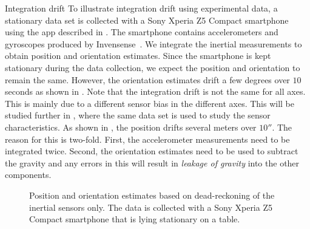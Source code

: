 \begin{myexample}{Integration drift}
To illustrate integration drift using experimental data, a stationary data set is collected with a Sony Xperia Z5 Compact smartphone using the app described in \cite{hendebyGWG:2017}. The smartphone contains accelerometers and gyroscopes produced by Invensense~\citep{invensense-tutorial}. We integrate the inertial measurements to obtain position and orientation estimates. Since the smartphone is kept stationary during the data collection, we expect the position and orientation to remain the same. However, the orientation estimates drift a few degrees over $10$ seconds as shown in . Note that the integration drift is not the same for all axes. This is mainly due to a different sensor bias in the different axes. This will be studied further in , where the same data set is used to study the sensor characteristics. As shown in , the position drifts several meters over $10 \second$. The reason for this is two-fold. First, the accelerometer measurements need to be integrated twice. Second, the orientation estimates need to be used to subtract the gravity and any errors in this will result in \emph{leakage of gravity} into the other components. 
\begin{figure}[t]
	\centering
	\caption{Position and orientation estimates based on dead-reckoning of the inertial sensors only. The data is collected with a Sony Xperia Z5 Compact smartphone that is lying stationary on a table.}
\end{figure}
\end{myexample}

